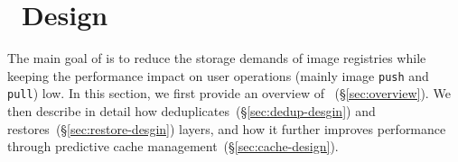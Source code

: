 \section{\sysname~Design}
\label{sec:Sift}

The main goal of \sysname is to reduce the storage demands of image registries
while keeping the performance impact on user operations (mainly image
\texttt{push} and \texttt{pull}) low.
%
In this section, we first provide an overview of
\sysname~(\S\ref{sec:overview}).
%
We then describe in detail how \sysname
deduplicates~(\S\ref{sec:dedup-desgin}) and
restores~(\S\ref{sec:restore-desgin}) layers, and how it further improves
performance through predictive cache management~(\S\ref{sec:cache-design}).








